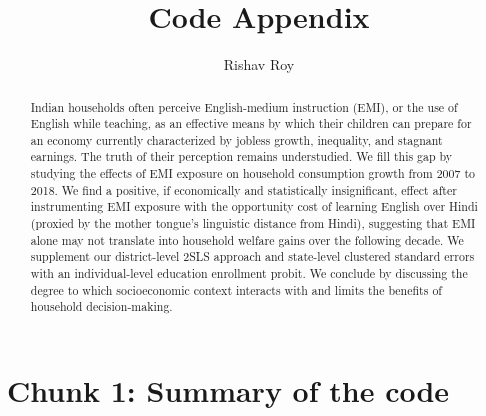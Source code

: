 \documentclass[
]{article}
\title{Code Appendix}
\author{Rishav Roy}
\date{}
\begin{document}
\maketitle
\begin{abstract}
Indian households often perceive English-medium instruction (EMI), or the use of English while teaching, as an effective means by which their children can prepare for an economy currently characterized by jobless growth, inequality, and stagnant earnings. The truth of their perception remains understudied. We fill this gap by studying the effects of EMI exposure on household consumption growth from 2007 to 2018. We find a positive, if economically and statistically insignificant, effect after instrumenting EMI exposure with the opportunity cost of learning English over Hindi (proxied by the mother tongue's linguistic distance from Hindi), suggesting that EMI alone may not translate into household welfare gains over the following decade. We supplement our district-level 2SLS approach and state-level clustered standard errors with an individual-level education enrollment probit. We conclude by discussing the degree to which socioeconomic context interacts with and limits the benefits of household decision-making.
\end{abstract}

\section*{Chunk 1: Summary of the code}\label{chunk-1-summary-of-the-code}
\end{document}
